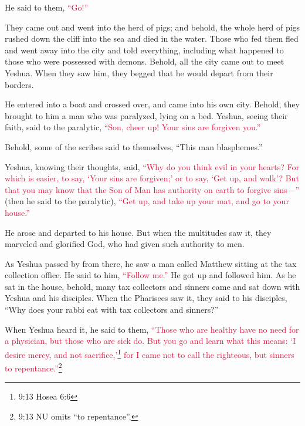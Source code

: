 \myverse{}He said to them,
\textcolor{crimson}{“Go!”}

They came out and went into the herd of pigs; and behold, the whole herd of pigs rushed down
the cliff into the sea and died in the water.
\myverse{}Those who fed them fled and went away into the city and told everything, including
what happened to those who were possessed with demons.
\myverse{}Behold, all the city came out to meet Yeshua. When they saw him, they begged
that he would depart from their borders.


\mychapter{} \myverse*{}He entered into a boat and crossed over, and came into his own
city.
\myverse{}Behold, they brought to him a man who was paralyzed, lying on a bed. Yeshua,
seeing their faith, said to the paralytic,
\textcolor{crimson}{“Son, cheer up! Your sins are forgiven you.”}

\myverse{}Behold, some of the scribes said to themselves, “This man blasphemes.”

\myverse{}Yeshua, knowing their thoughts, said,
\textcolor{crimson}{“Why do you think evil in your hearts?
}
\myverse{}\textcolor{crimson}{For which is easier, to say, ‘Your sins are forgiven;’ or to say, ‘Get up,
	and walk’?
}
\myverse{}\textcolor{crimson}{But that you may know that the Son of Man has authority on earth to forgive
	sins—”} (then he said to the paralytic),
\textcolor{crimson}{“Get up, and take up your mat, and go to your house.”}

\myverse{}He arose and departed to his house.
\myverse{}But when the multitudes saw it, they marveled and glorified God, who had given
such authority to men.

\myverse{}As Yeshua passed by from there, he saw a man called Matthew sitting
at the tax collection office. He said to him,
\textcolor{crimson}{“Follow me.”} He got up and followed him.
\myverse{}As he sat in the house, behold, many tax collectors and sinners came and sat
down with Yeshua and his disciples.
\myverse{}When the Pharisees saw it, they said to his disciples, “Why does your rabbi eat
with tax collectors and sinners?”

\myverse{}When Yeshua heard it, he said to them,
\textcolor{crimson}{“Those who are healthy have no need for a physician, but those who are sick do.
}
\myverse{}\textcolor{crimson}{But you go and learn what this means: ‘I desire mercy, and not sacrifice,’}\footnote{9:13 Hosea 6:6}
\textcolor{crimson}{for I came not to call the righteous, but sinners to repentance.”}\footnote{9:13 NU omits “to repentance”.}

